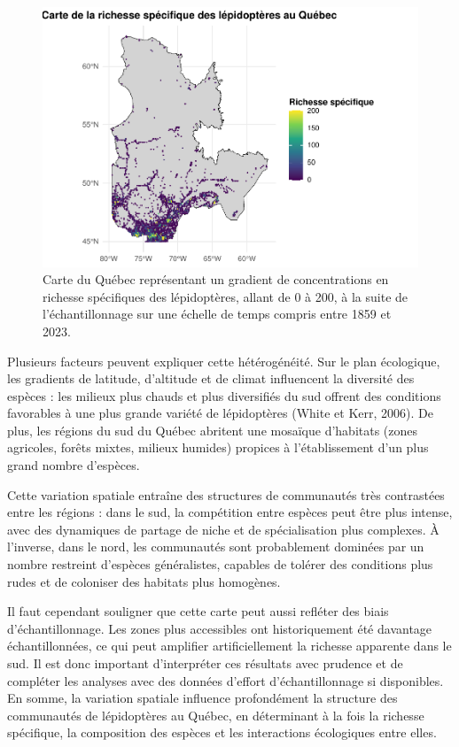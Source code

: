 \documentclass[9pt,twocolumn,twoside,]{pnas-new}
\begin{document}
\begin{figure}[H]

{\centering \includegraphics[width=0.7\linewidth]{rapport_final_BIO500_files/figure-latex/fig_richesse_spatiale-1} 

}

\caption{\label{fig:fig_richesse_spatiale}Carte du Québec représentant un gradient de concentrations en richesse spécifiques des lépidoptères, allant de 0 à 200, à la suite de l’échantillonnage sur une échelle de temps compris entre 1859 et 2023.}\label{fig:fig_richesse_spatiale}
\end{figure}

Plusieurs facteurs peuvent expliquer cette hétérogénéité. Sur le plan
écologique, les gradients de latitude, d'altitude et de climat
influencent la diversité des espèces : les milieux plus chauds et plus
diversifiés du sud offrent des conditions favorables à une plus grande
variété de lépidoptères (White et Kerr, 2006). De plus, les régions du
sud du Québec abritent une mosaïque d'habitats (zones agricoles, forêts
mixtes, milieux humides) propices à l'établissement d'un plus grand
nombre d'espèces.

Cette variation spatiale entraîne des structures de communautés très
contrastées entre les régions : dans le sud, la compétition entre
espèces peut être plus intense, avec des dynamiques de partage de niche
et de spécialisation plus complexes. À l'inverse, dans le nord, les
communautés sont probablement dominées par un nombre restreint d'espèces
généralistes, capables de tolérer des conditions plus rudes et de
coloniser des habitats plus homogènes.

Il faut cependant souligner que cette carte peut aussi refléter des
biais d'échantillonnage. Les zones plus accessibles ont historiquement
été davantage échantillonnées, ce qui peut amplifier artificiellement la
richesse apparente dans le sud. Il est donc important d'interpréter ces
résultats avec prudence et de compléter les analyses avec des données
d'effort d'échantillonnage si disponibles. En somme, la variation
spatiale influence profondément la structure des communautés de
lépidoptères au Québec, en déterminant à la fois la richesse spécifique,
la composition des espèces et les interactions écologiques entre elles.
\end{document}

